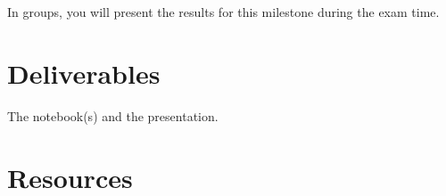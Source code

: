 In groups, you will present the results for this milestone during the
exam time.

\section{Deliverables}

The notebook(s) and the presentation.

\section{Resources}





\begin{comment}

\subsection{Using (also) the lost phase in IBMC}
There are different alternatives for recovering the ``lost'' phases
(remember that we have two subbands, and two downsamplers) during the
DWT (in the 1D case). The result of this procedure is know as the
Overcomplete DWT (ODWT). Notice, however, that we are not interested
in encoding the ODWT domain, but in encoding the DWT that is more
compact. To achieve this, at least the following techniques can be
used:

\subsection{Performing IBMC in the 1-levels MDWT domain}
Once that the missing phases have been recovered, the MC procedure
between two frames (the reference frame $R$ and the predicted frame
$P$) that we are going to implement is:
\begin{enumerate}
\item  Therefore, estimate the motion between the overcomplete
  low-frequency subband of the reference frame $[R.L]$ and the
  overcomplete low-frequency subband of the predicted frame
  $[P.L]$. The output of this step is a motion vectors field
  $\overrightarrow{V}$, that describes how to project the $[R.L]$ onto
  $[P.L]$. Notice that $\overrightarrow{V}$ should be also a good
  candidate for mapping $R$ onto $P$.
  
\item Use $\overrightarrow{V}$ and $[R.H]$ (notice that in 2D case,
  $[R.H]=\{[R.HL], [R.LH], [R.HH]\}$) to generate a prediction
  $[\hat{P}.L]$. We define the prediction error
  in the overcomplete low-frequency subband as
  \begin{equation}
    [E.L] = [P.L] - [\hat{P}.L],
    \label{eq:prediction_error_L}
  \end{equation}
  and the prediction error in the overcomplete high-frequency subband
  as
  \begin{equation}
    [E.H] = [P.H] - [\hat{P}.H].
    \label{eq:prediction_error}
  \end{equation}


\end{comment}

